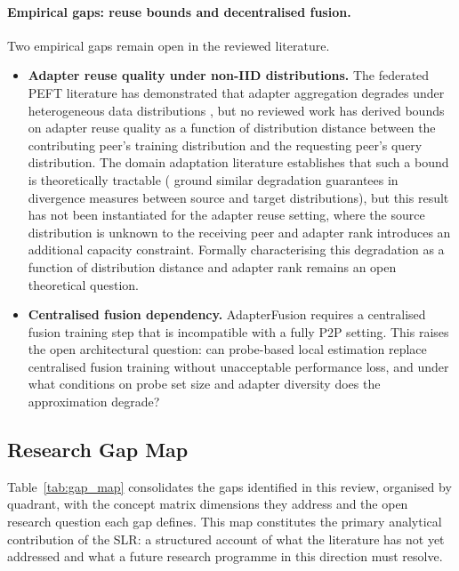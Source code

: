 \paragraph{Empirical gaps: reuse bounds and decentralised fusion.}
Two empirical gaps remain open in the reviewed literature.
\begin{itemize}
  \item \textbf{Adapter reuse quality under non-IID distributions.} The federated PEFT literature has demonstrated that adapter aggregation degrades under heterogeneous data distributions \citep{ZhangFedPETuning2023, Li2020FedProx}, but no reviewed work has derived bounds on adapter reuse quality as a function of distribution distance between the contributing peer's training distribution and the requesting peer's query distribution. The domain adaptation literature establishes that such a bound is theoretically tractable (\citet{BenDavid2010} ground similar degradation guarantees in divergence measures between source and target distributions), but this result has not been instantiated for the adapter reuse setting, where the source distribution is unknown to the receiving peer and adapter rank introduces an additional capacity constraint. Formally characterising this degradation as a function of distribution distance and adapter rank remains an open theoretical question.
  
  \item \textbf{Centralised fusion dependency.} AdapterFusion \citep{Pfeiffer2021fusion}
    requires a centralised fusion training step that is incompatible with a fully
    P2P setting. This raises the open architectural question: can probe-based
    local estimation replace centralised fusion training without unacceptable
    performance loss, and under what conditions on probe set size and adapter
    diversity does the approximation degrade?
\end{itemize}

\subsection{Research Gap Map}
\label{sec:synthesis_gap:gap_map}

Table~\ref{tab:gap_map} consolidates the gaps identified in this review,
organised by quadrant, with the concept matrix dimensions they address
and the open research question each gap defines. This map constitutes
the primary analytical contribution of the SLR: a structured account of
what the literature has not yet addressed and what a future research programme
in this direction must resolve.

